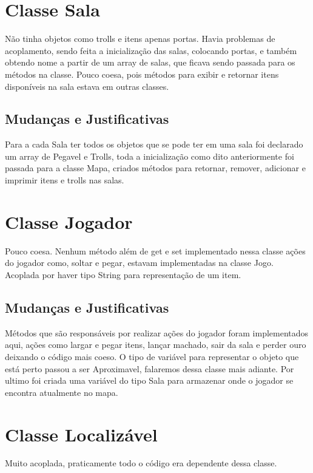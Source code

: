 \documentclass[runningheads,a4paper]{llncs}
\begin{document}
\section{Classe Sala}

Não tinha objetos como trolls e itens apenas portas. Havia problemas de acoplamento, sendo feita a inicialização das salas, colocando portas, e também obtendo nome a partir de um array de salas, que ficava sendo passada para os métodos na classe. Pouco coesa, pois métodos para exibir e retornar itens disponíveis na sala estava em outras classes.

\subsection{Mudanças e Justificativas}

Para a cada Sala ter todos os objetos que se pode ter em uma sala foi declarado um array de Pegavel e Trolls, toda a inicialização como dito anteriormente foi passada para a classe Mapa, criados métodos para retornar, remover, adicionar e imprimir itens e trolls nas salas.

\section{Classe Jogador}

Pouco coesa. Nenhum método além de get e set implementado nessa classe ações do jogador como, soltar e pegar, estavam implementadas na classe Jogo. Acoplada por haver tipo String para representação de um item.

\subsection{Mudanças e Justificativas}

Métodos que são responsáveis por realizar ações do jogador foram implementados aqui, ações como largar e pegar itens, lançar machado, sair da sala e perder ouro deixando o código mais coeso. O tipo de variável para representar o objeto que está perto passou a ser Aproximavel, falaremos dessa classe mais adiante. Por ultimo foi criada uma variável do tipo Sala para armazenar onde o jogador se encontra atualmente no mapa. 

\section{Classe Localizável}

Muito acoplada, praticamente todo o código era dependente dessa classe.
\end{document}
